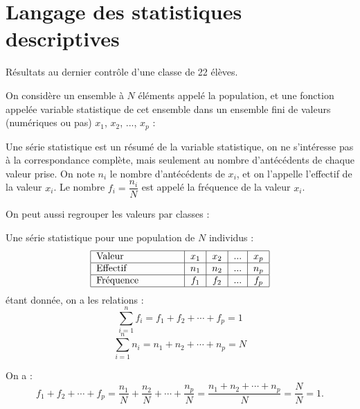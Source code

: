 \documentclass[a4paper,11pt,DIV12,BCOR0mm]{scrartcl}
\begin{document}
\section{Langage des statistiques descriptives}
\begin{exemple}
 Résultats au dernier contrôle d'une classe de 22 élèves.
\end{exemple}

On considère un ensemble à $N$ éléments appelé la population, et une
fonction appelée variable statistique de cet ensemble dans un ensemble fini de valeurs
(numériques ou pas)
$x_1$, $x_2$, ..., $x_p$ :

Une série statistique est un résumé de la variable statistique, on ne s'intéresse pas 
à la correspondance complète, mais seulement au nombre d'antécédents de chaque valeur prise.
On note $n_i$ le nombre d'antécédents de $x_i$, et on l'appelle l'effectif de la valeur $x_i$.
Le nombre $f_i=\dfrac{n_i}{N}$ est appelé la fréquence de la valeur $x_i$.


On peut aussi regrouper les valeurs par classes :



\pagebreak
\begin{theoreme}
Une série statistique pour une population de $N$ individus :
\[ 
\begin{tabular}{|p{3cm}|c|c|c|c|}
 \hline
 \text{Valeur}		&	$x_1$	&	$x_2$	&	...	&	$x_p$ \\\hline
 Effectif	&	$n_1$	&	$n_2$	&	...	&	$n_p$ \\\hline
 Fréquence	&	$f_1$	&	$f_2$	&	...	&	$f_p$ \\\hline
\end{tabular}
\]
étant donnée, on a les relations :
\[ 
 \sum_{i=1}^{n}f_i=f_1+f_2+\cdots+f_p=1 
\]
\[ 
 \sum_{i=1}^{n}n_i=n_1+n_2+\cdots+n_p=N 
\]
\end{theoreme}
\begin{demonstration}
On a :
\[
f_1+f_2+\cdots+f_p=\dfrac{n_1}{N}+\dfrac{n_2}{N}+\cdots+\dfrac{n_p}{N}=\dfrac{n_1+n_2+\cdots+n_p}{N}=\dfrac{N}{N}=1.
\]
\end{demonstration}

\end{document}
